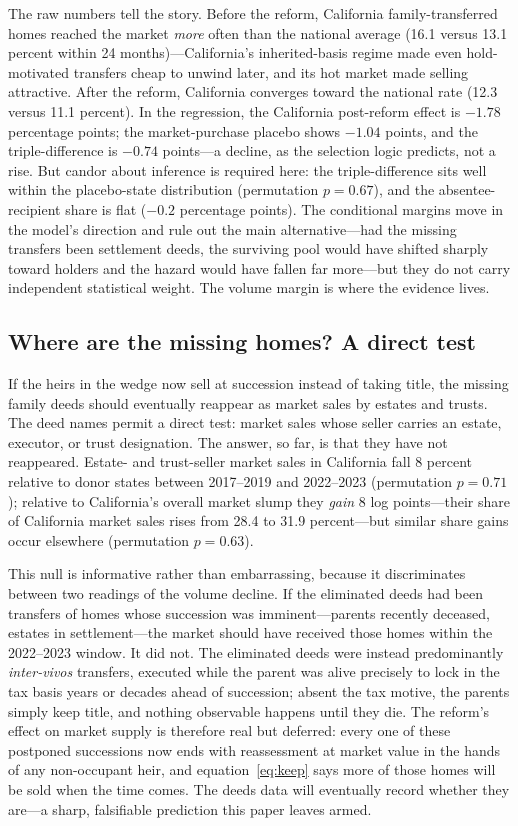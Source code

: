 \documentclass[12pt, letterpaper]{article}
\begin{document}
The raw numbers tell the story. Before the reform, California
family-transferred homes reached the market \emph{more} often than the
national average (16.1 versus 13.1 percent within 24 months)---California's
inherited-basis regime made even hold-motivated transfers cheap to unwind
later, and its hot market made selling attractive. After the reform,
California converges toward the national rate (12.3 versus 11.1 percent). In
the regression, the California post-reform effect is $-1.78$ percentage
points; the market-purchase placebo shows $-1.04$ points, and the
triple-difference is $-0.74$ points---a decline, as the selection logic
predicts, not a rise. But candor about inference is required here: the
triple-difference sits well within the placebo-state distribution
(permutation $p = 0.67$), and the absentee-recipient share is flat
($-0.2$ percentage points). The conditional margins move in the model's
direction and rule out the main alternative---had the missing transfers been
settlement deeds, the surviving pool would have shifted sharply toward
holders and the hazard would have fallen far more---but they do not carry
independent statistical weight. The volume margin is where the evidence
lives.

\subsection{Where are the missing homes? A direct test}\label{subsec:directtest}

If the heirs in the wedge now sell at succession instead of taking title,
the missing family deeds should eventually reappear as market sales by
estates and trusts. The deed names permit a direct test: market sales whose
seller carries an estate, executor, or trust designation. The answer, so
far, is that they have not reappeared. Estate- and trust-seller market sales
in California fall 8 percent relative to donor states between 2017--2019 and
2022--2023 (permutation $p = 0.71$); relative to California's overall market
slump they \emph{gain} 8 log points---their share of California market sales
rises from 28.4 to 31.9 percent---but similar share gains occur elsewhere
(permutation $p = 0.63$).

This null is informative rather than embarrassing, because it discriminates
between two readings of the volume decline. If the eliminated deeds had been
transfers of homes whose succession was imminent---parents recently deceased,
estates in settlement---the market should have received those homes within
the 2022--2023 window. It did not. The eliminated deeds were instead
predominantly \emph{inter-vivos} transfers, executed while the parent was
alive precisely to lock in the tax basis years or decades ahead of
succession; absent the tax motive, the parents simply keep title, and
nothing observable happens until they die. The reform's effect on market
supply is therefore real but deferred: every one of these postponed
successions now ends with reassessment at market value in the hands of any
non-occupant heir, and equation~\eqref{eq:keep} says more of those homes
will be sold when the time comes. The deeds data will eventually record
whether they are---a sharp, falsifiable prediction this paper leaves armed.
\end{document}
